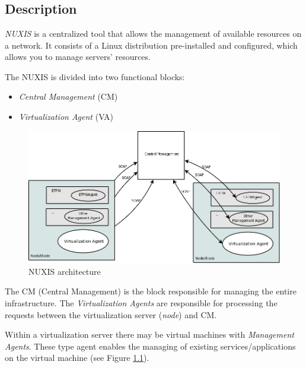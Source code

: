 \chapter{\textsf{\acronym}}
\section*{Description}
\emph{NUXIS} is a centralized tool that allows the management of available resources on a network. It consists of a Linux distribution pre-installed and configured, which allows you to manage servers' resources.

The NUXIS is divided into two functional blocks:

\begin{itemize}
	\item \emph{Central Management} (CM)
    \item \emph{Virtualization Agent} (VA)
\end{itemize}

\begin{figure}[H]
	\begin{center}
	\includegraphics[scale=0.35]{screenshots/etva_blocos.png}
	\caption{NUXIS architecture}
	\label{fig:etva_blocos}
	\end{center}
\end{figure}

The CM (Central Management) is the block responsible for managing the entire infrastructure.
The \emph{Virtualization Agents} are responsible for processing the requests between the virtualization server (\emph{node}) and CM.

Within a virtualization server there may be virtual machines with \emph{Management Agents}. These type agent enables the managing of existing services/applications on the virtual machine (see Figure \ref{fig:etva_blocos}).

